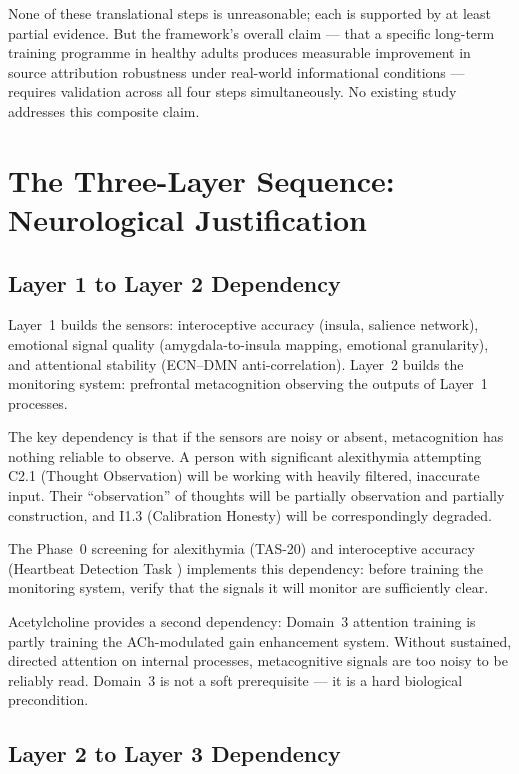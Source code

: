 \documentclass[12pt, a4paper]{article}
\begin{document}
None of these translational steps is unreasonable; each is supported by at
least partial evidence. But the framework's overall claim --- that a specific
long-term training programme in healthy adults produces measurable improvement
in source attribution robustness under real-world informational conditions ---
requires validation across all four steps simultaneously. No existing study
addresses this composite claim.

\section{The Three-Layer Sequence: Neurological Justification}

\subsection{Layer 1 to Layer 2 Dependency}

Layer~1 builds the sensors: interoceptive accuracy (insula, salience network),
emotional signal quality (amygdala-to-insula mapping, emotional granularity), and
attentional stability (ECN--DMN anti-correlation). Layer~2 builds the monitoring
system: prefrontal metacognition observing the outputs of Layer~1 processes.

The key dependency is that if the sensors are noisy or absent, metacognition has
nothing reliable to observe. A person with significant alexithymia attempting C2.1
(Thought Observation) will be working with heavily filtered, inaccurate input.
Their ``observation'' of thoughts will be partially observation and partially
construction, and I1.3 (Calibration Honesty) will be correspondingly degraded.

The Phase~0 screening for alexithymia (TAS-20) and interoceptive accuracy (Heartbeat
Detection Task \citep{schandry1981}) implements this dependency: before training the
monitoring system, verify that the signals it will monitor are sufficiently clear.

Acetylcholine provides a second dependency: Domain~3 attention training is partly
training the ACh-modulated gain enhancement system. Without sustained, directed
attention on internal processes, metacognitive signals are too noisy to be reliably
read. Domain~3 is not a soft prerequisite --- it is a hard biological precondition.

\subsection{Layer 2 to Layer 3 Dependency}
\end{document}
